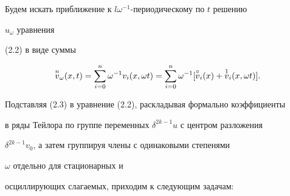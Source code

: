 Будем искать приближение к $l\omega^{-1}$-периодическому по $t$ решению 


$u_\omega$ уравнения 


(2.2) в виде суммы 


\begin{equation} 


\up{n}{v}_\omega(x,t)=\sum^n_{i=0}\omega^{-1} 


v_i(x,\omega t)=\sum^n_{i=0}\omega^{-1} 


[\up{\circ}{v}_i(x)+\up{1}{v}_i(x,\omega t)]. 


\end{equation} 


Подставляя (2.3) в уравнение (2.2), раскладывая формально коэффициенты 


в ряды Тейлора по группе переменных $\delta^{2k-1}u$ с центром разложения 


$\delta^{2k-1}v_0$, а затем группируя члены с одинаковыми степенями


$\omega$ отдельно для стационарных и 


осциллирующих слагаемых, приходим к следующим задачам: 


